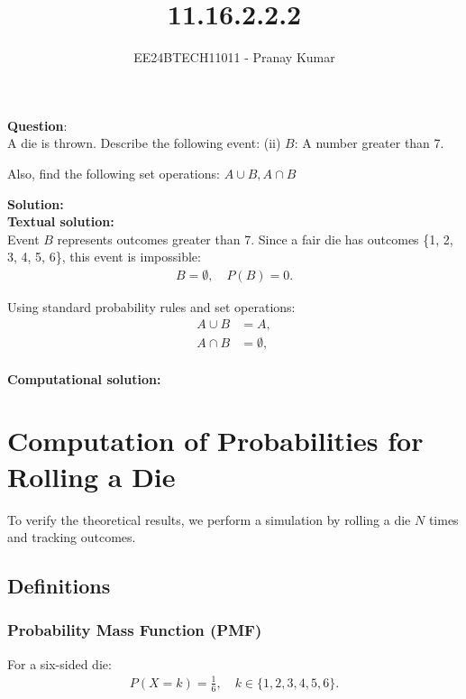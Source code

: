 \documentclass[journal]{IEEEtran}
\begin{document}

\vspace{3cm}

\title{11.16.2.2.2}
\author{EE24BTECH11011 - Pranay Kumar}
\maketitle

\renewcommand{\thefigure}{\theenumi}
\renewcommand{\thetable}{\theenumi}
\setlength{\intextsep}{10pt}

\renewcommand{\thetable}{\theenumi}

\textbf{Question}:\\
A die is thrown. Describe the following event:
(ii) \( B \): A number greater than 7.

Also, find the following set operations: 
\( A \cup B, A \cap B\)

\textbf{Solution: }\\

\textbf{Textual solution: }\\
Event \( B \) represents outcomes greater than 7. Since a fair die has outcomes \{1, 2, 3, 4, 5, 6\}, this event is impossible:
\begin{align}
    B = \emptyset, \quad P(B) = 0.
\end{align}

Using standard probability rules and set operations:
\begin{align}
    A \cup B &= A, \\
    A \cap B &= \emptyset, \\

\end{align}

\textbf{Computational solution: }\\
\section*{Computation of Probabilities for Rolling a Die}
To verify the theoretical results, we perform a simulation by rolling a die \( N \) times and tracking outcomes.

\subsection*{Definitions}
\subsubsection*{Probability Mass Function (PMF)}
For a six-sided die:
\begin{align}
    P(X = k) = \frac{1}{6}, \quad k \in \{1,2,3,4,5,6\}.
\end{align}
\end{document}
